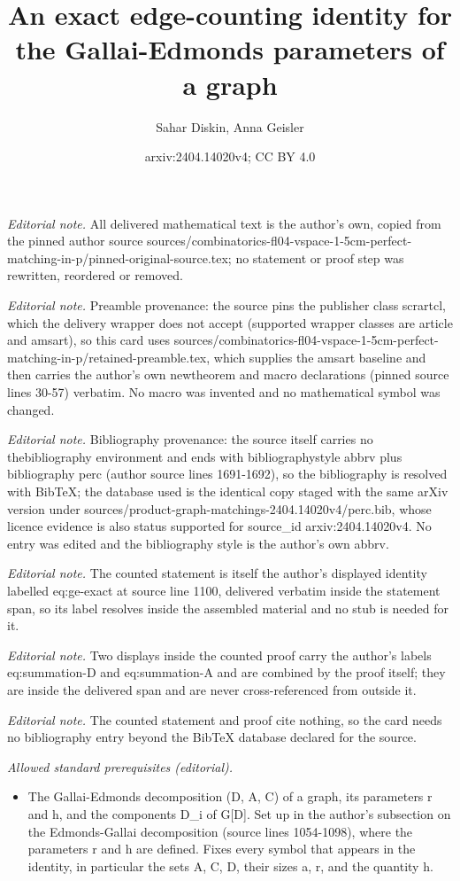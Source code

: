 \documentclass[10pt,a4paper]{amsart}
\title{An exact edge-counting identity for the Gallai-Edmonds parameters of a graph}
\author{Sahar Diskin, Anna Geisler}
\date{arxiv:2404.14020v4; CC BY 4.0}
\begin{document}
\maketitle
\noindent\textit{Editorial note.} All delivered mathematical text is the author's own, copied from the pinned author source sources/combinatorics-fl04-vspace-1-5cm-perfect-matching-in-p/pinned-original-source.tex; no statement or proof step was rewritten, reordered or removed.\par\medskip
\noindent\textit{Editorial note.} Preamble provenance: the source pins the publisher class scrartcl, which the delivery wrapper does not accept (supported wrapper classes are article and amsart), so this card uses sources/combinatorics-fl04-vspace-1-5cm-perfect-matching-in-p/retained-preamble.tex, which supplies the amsart baseline and then carries the author's own newtheorem and macro declarations (pinned source lines 30-57) verbatim. No macro was invented and no mathematical symbol was changed.\par\medskip
\noindent\textit{Editorial note.} Bibliography provenance: the source itself carries no thebibliography environment and ends with bibliographystyle abbrv plus bibliography perc (author source lines 1691-1692), so the bibliography is resolved with BibTeX; the database used is the identical copy staged with the same arXiv version under sources/product-graph-matchings-2404.14020v4/perc.bib, whose licence evidence is also status supported for source\_id arxiv:2404.14020v4. No entry was edited and the bibliography style is the author's own abbrv.\par\medskip
\noindent\textit{Editorial note.} The counted statement is itself the author's displayed identity labelled eq:ge-exact at source line 1100, delivered verbatim inside the statement span, so its label resolves inside the assembled material and no stub is needed for it.\par\medskip
\noindent\textit{Editorial note.} Two displays inside the counted proof carry the author's labels eq:summation-D and eq:summation-A and are combined by the proof itself; they are inside the delivered span and are never cross-referenced from outside it.\par\medskip
\noindent\textit{Editorial note.} The counted statement and proof cite nothing, so the card needs no bibliography entry beyond the BibTeX database declared for the source.\par\medskip
\noindent\textit{Allowed standard prerequisites (editorial).}\begin{itemize}
\item The Gallai-Edmonds decomposition (D, A, C) of a graph, its parameters r and h, and the components D\_i of G[D]. Set up in the author's subsection on the Edmonds-Gallai decomposition (source lines 1054-1098), where the parameters r and h are defined. Fixes every symbol that appears in the identity, in particular the sets A, C, D, their sizes a, r, and the quantity h.
\end{itemize}\medskip
\end{document}
